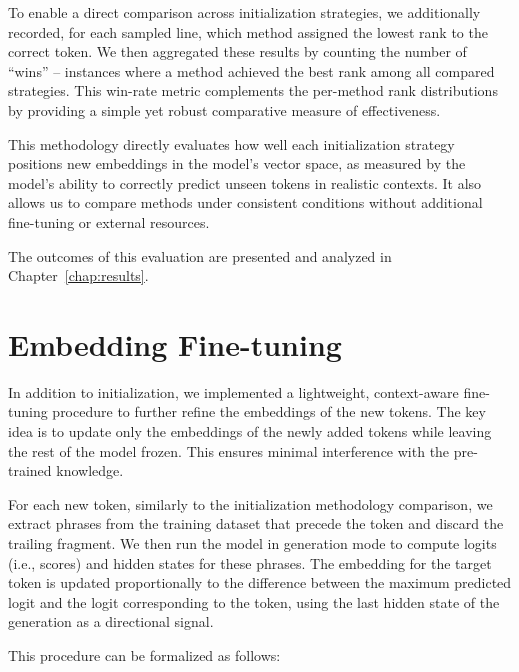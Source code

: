 To enable a direct comparison across initialization strategies, we additionally recorded, for each sampled line, which method assigned the lowest rank to the correct token. We then aggregated these results by counting the number of ``wins'' -- instances where a method achieved the best rank among all compared strategies. This win-rate metric complements the per-method rank distributions by providing a simple yet robust comparative measure of effectiveness.

This methodology directly evaluates how well each initialization strategy positions new embeddings in the model's vector space, as measured by the model’s ability to correctly predict unseen tokens in realistic contexts. It also allows us to compare methods under consistent conditions without additional fine-tuning or external resources.

The outcomes of this evaluation are presented and analyzed in Chapter~\ref{chap:results}.



\section{Embedding Fine-tuning}
\label{sec:embedding_finetune}

In addition to initialization, we implemented a lightweight, context-aware fine-tuning procedure to further refine the embeddings of the new tokens. The key idea is to update only the embeddings of the newly added tokens while leaving the rest of the model frozen. This ensures minimal interference with the pre-trained knowledge. 

For each new token, similarly to the initialization methodology comparison, we extract phrases from the training dataset that precede the token and discard the trailing fragment. We then run the model in generation mode to compute logits (i.e., scores) and hidden states for these phrases. The embedding for the target token is updated proportionally to the difference between the maximum predicted logit and the logit corresponding to the token, using the last hidden state of the generation as a directional signal.  

This procedure can be formalized as follows:

